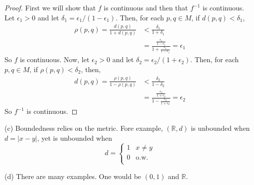 \documentclass[11pt]{amsart}
\begin{document}
\begin{proof}
  First we will show that $f$ is continuous and then that $f^{-1}$ is continuous. Let $\epsilon_{1} > 0$ and let $\delta_{1} = \epsilon_{1} / (1 - \epsilon_{1})$. Then, for each $p,q\in M$, if $d(p,q) < \delta_{1}$,
  \begin{align*}
    \rho(p,q) = \frac{d(p,q)}{1 + d(p,q)} & < \frac{\delta_{1}}{1 + \delta_{1}} \\
    & = \frac{\frac{\epsilon_{1}}{1 - \epsilon_{1}}}{1 + \frac{\epsilon_{1}}{1 - \epsilon_{1}}} = \epsilon_{1}
  \end{align*}
  So $f$ is continuous. Now, let $\epsilon_{2} > 0$ and let $\delta_{2} = \epsilon_{2} / (1 + \epsilon_{2})$. Then, for each $p,q\in M$, if $\rho(p,q) < \delta_{2}$, then,
  \begin{align*}
    d(p,q) = \frac{\rho(p,q)}{1 - \rho(p,q)} & < \frac{\delta_{2}}{1 - \delta_{2}} \\
    & = \frac{ \frac{\epsilon_{2}}{1 + \epsilon_{2}}}{ 1 - \frac{\epsilon_{2}}{1 + \epsilon_{2}}} = \epsilon_{2}
  \end{align*}
  So $f^{-1}$ is continuous.
\end{proof}

(c) Boundedness relies on the metric. Fore example, $(\mathbb{R}, d)$ is unbounded when $d = |x-y|$, yet is unbounded when 
\[ d = \left\{ \begin{array}{cl}
    1 & x \neq y \\
    0 & \text{o.w.} \\
\end{array} \right. \]

(d) There are many examples. One would be $(0,1)$ and $\mathbb{R}$.
\end{document}
